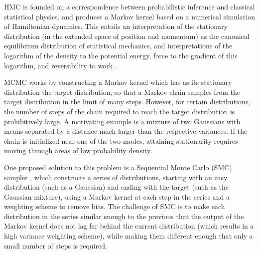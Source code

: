 \documentclass{article}
\begin{document}
HMC is founded on a correspondence between probabilistic inference and classical statistical physics, and produces a Markov kernel based on a numerical simulation of Hamiltonian dynamics. This entails an interpretation of the stationary distribution (in the extended space of position and momentum) as the canonical equilibrium distribution of statistical mechanics, and interpretations of the logarithm of the density to the potential energy, force to the gradient of this logarithm, and reversibility to work \cite{sivak2013using}.

MCMC works by constructing a Markov kernel which has as its stationary distribution the target distribution, so that a   Markov chain samples from the target distribution in the limit of many steps. However, for certain distributions, the number of steps of the chain required to reach the target distribution is prohibitively large. A motivating example is a mixture of two Gaussians with means separated by a distance much larger than the respective variances. If the chain is initialized near one of the two modes, attaining stationarity requires moving through areas of low probability density.

One proposed solution to this problem is a Sequential Monte Carlo (SMC) sampler \cite{del2006sequential}, which constructs a series of distributions, starting with an easy distribution (such as a Gaussian) and ending with the target (such as the Gaussian mixture), using a Markov kernel at each step in the series and a weighting scheme to remove bias. The challenge of SMC is to make each distribution in the series similar enough to the previous that the output of the Markov kernel does not lag far behind the current distribution (which results in a high variance weighting scheme), while making them different enough that only a small number of steps is required. 

\end{document}
